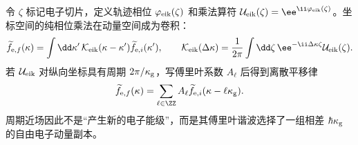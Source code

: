 令 $\zeta$ 标记电子切片，定义轨迹相位 $\varphi_{\rm eik}(\zeta)$ 和乘法算符 $\mathcal U_{\rm eik}(\zeta)=\ee^{\ii\varphi_{\rm eik}(\zeta)}$。坐标空间的纯相位乘法在动量空间成为卷积：
\begin{equation*}
\widetilde f_{\mathrm e,f}(\kappa)=\int\dd \kappa'\,\mathcal K_{\rm eik}(\kappa-\kappa')\widetilde f_{\mathrm e,i}(\kappa'),
\qquad
\mathcal K_{\rm eik}(\Delta\kappa)=\frac1{2\pi}\int\dd\zeta\,\ee^{-\ii\Delta\kappa\zeta}\mathcal U_{\rm eik}(\zeta).
\end{equation*}
若 $\mathcal U_{\rm eik}$ 对纵向坐标具有周期 $2\pi/\kappa_{\rm g}$，写傅里叶系数 $A_\ell$ 后得到离散平移律
\begin{equation}
{
\widetilde f_{\mathrm e,f}(\kappa)=\sum_{\ell\in\ZZ}A_\ell\widetilde f_{\mathrm e,i}(\kappa-\ell\kappa_{\rm g}).}
\label{eq:general_periodic_eikonal_discrete_convolution}
\end{equation}
周期近场因此不是“产生新的电子能级”，而是其傅里叶谐波选择了一组相差 $\hbar\kappa_{\rm g}$ 的自由电子动量副本。

